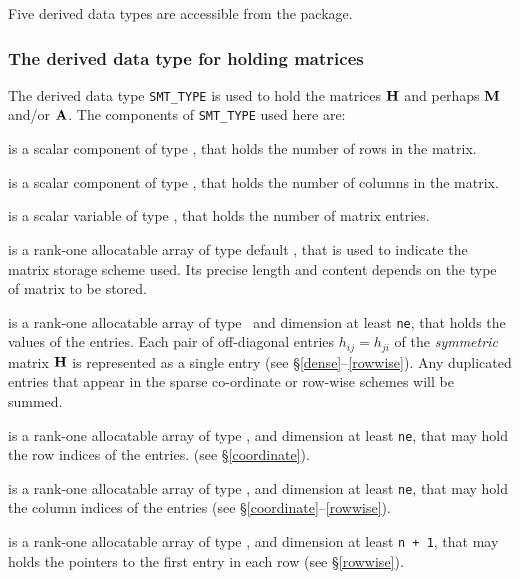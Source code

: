 \documentclass{galahad}
\begin{document}







\galtypes
Five derived data types are accessible from the package.


\subsubsection{The derived data type for holding matrices}\label{typesmt}
The derived data type {\tt SMT\_TYPE} is used to hold the matrices ${\mathbf{H}}$
and perhaps ${\mathbf{M}}$ and/or ${\mathbf{A}}$.
The components of {\tt SMT\_TYPE} used here are:

\begin{description}

 is a scalar component of type \integer,
that holds the number of rows in the matrix.

 is a scalar component of type \integer,
that holds the number of columns in the matrix.

 is a scalar variable of type \integer, that
holds the number of matrix entries.

 is a rank-one allocatable array of type default \character, that
is used to indicate the matrix storage scheme used. Its precise length and
content depends on the type of matrix to be stored.

 is a rank-one allocatable array of type \realdp\,
and dimension at least {\tt ne}, that holds the values of the entries.
Each pair of off-diagonal entries $h_{ij} = h_{ji}$ of the {\em symmetric}
matrix ${\mathbf{H}}$ is represented as a single entry
(see \S\ref{dense}--\ref{rowwise}).
Any duplicated entries that appear in the sparse
co-ordinate or row-wise schemes will be summed.

 is a rank-one allocatable array of type \integer,
and dimension at least {\tt ne}, that may hold the row indices of the entries.
(see \S\ref{coordinate}).

 is a rank-one allocatable array of type \integer,
and dimension at least {\tt ne}, that may hold the column indices of the entries
(see \S\ref{coordinate}--\ref{rowwise}).

 is a rank-one allocatable array of type \integer,
and dimension at least {\tt n + 1}, that may holds the pointers to
the first entry in each row (see \S\ref{rowwise}).

\end{description}
\end{document}
